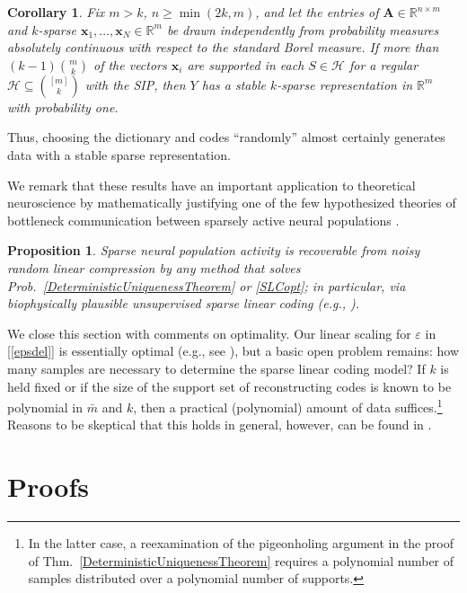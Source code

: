 \documentclass[9pt,twocolumn]{pnas-new}
\newtheorem{proposition}{Proposition}
\newtheorem{corollary}{Corollary}
\renewcommand{\eqref}[1]{\textnormal{[\ref{#1}]}}
\begin{document}
\begin{corollary}\label{ProbabilisticCor}
Fix $m > k$, $n \geq \min(2k, m)$, and let the entries of $\mathbf{A} \in \mathbb{R}^{n \times m}$ and $k$-sparse $\mathbf{x}_1, \ldots, \mathbf{x}_N \in \mathbb{R}^m$ be drawn independently from probability measures absolutely continuous with respect to the standard Borel measure. If more than $(k-1){m \choose k}$ of the vectors $\mathbf{x}_i$ are supported in each $S \in \mathcal{H}$ for a regular $\mathcal{H} \subseteq {[m] \choose k}$ with the SIP, then $Y$ has a stable $k$-sparse representation in $\mathbb{R}^m$ with probability one.
\end{corollary}

Thus, choosing the dictionary and codes ``randomly'' almost certainly generates data with a stable sparse representation.

We remark that these results have an important application to theoretical neuroscience by mathematically justifying one of the few hypothesized theories of bottleneck communication between sparsely active neural populations \cite{Isely10}. 

\begin{proposition}\label{neuroprop}
Sparse neural population activity is recoverable from noisy random linear compression by any method that solves Prob.~\ref{DeterministicUniquenessTheorem} or \ref{SLCopt}; in particular, via biophysically plausible unsupervised sparse linear coding (e.g., \cite{rehnsommer2007, rozell2007neurally}).
\end{proposition}

We close this section with comments on optimality.  Our linear scaling for $\varepsilon$ in \eqref{epsdel} is essentially optimal (e.g., see \cite{arias2013fundamental}), but a basic open problem remains: how many samples are necessary to determine the sparse linear coding model? If $k$ is held fixed or if the size of the support set of reconstructing codes is known to be polynomial in $\bar m$ and $k$, then a practical (polynomial) amount of data suffices.\footnote{In the latter case, a reexamination of the pigeonholing argument in the proof of Thm.~\ref{DeterministicUniquenessTheorem} requires a polynomial number of samples distributed over a polynomial number of supports.} Reasons to be skeptical that this holds in general, however, can be found in \cite{tillmann2014computational, Tillmann15}.

\section{Proofs}\label{DUT} %
\end{document}
